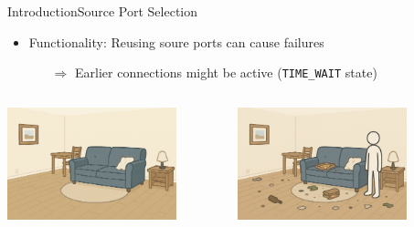 \documentclass[aspectratio=169, hyperref={colorlinks=true, allcolors=SecondaryColor}, c]{beamer}
\begin{document}
\begin{frame}[fragile]{Introduction}{Source Port Selection}
	\begin{itemize}
		\item \alert{Functionality:} Reusing soure ports can cause failures
		\begin{itemize}
			\item[\alert{$\Rightarrow$}] Earlier connections might be active (\texttt{TIME\_WAIT} state)
		\end{itemize}
	\end{itemize}
	\begin{columns}
		\begin{column}[t]{0.33\textwidth}
			\vspace{2cm}

			\includegraphics[width=0.8\textwidth, center]{./figures/room_cleaned.png}
		\end{column}
		\begin{column}[t]{0.33\textwidth}
			\vspace{0cm}

			\includegraphics[width=0.8\textwidth, center]{./figures/room_not_cleaned.png}
		\end{column}
		\begin{column}[t]{0.33\textwidth}
			\vspace{0cm}


\end{column}
\end{columns}
\end{frame}
\end{document}
